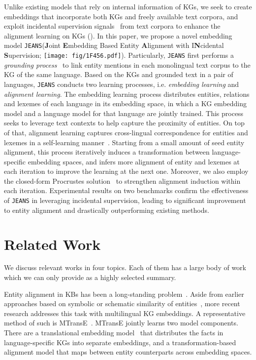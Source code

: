\documentclass[11pt,a4paper]{article}
\newcommand{\stitle}[1]{\vspace{2ex} \noindent{\bf #1}}
\newcommand{\modelname}[0]{\texttt{JEANS}\xspace}
\begin{document}
Unlike existing models that rely on internal information of KGs, we seek to create embeddings that incorporate both KGs and freely available text corpora, and exploit incidental supervision signals~\cite{roth2017incidental} from text corpora to enhance the alignment learning on KGs ().
In this paper, we propose a novel embedding model \modelname (\textbf{J}oint \textbf{E}mbedding Based Entity \textbf{A}lignment with I\textbf{N}cidental \textbf{S}upervision; \texttt{[image: fig/1F456.pdf]}).
Particularly, \modelname first performs a \emph{grounding process}~\cite{gupta2017entity,upadhyay2018joint} to link entity mentions in each monolingual text corpus to the KG of the same language.
Based on the KGs and grounded text in a pair of languages, \modelname conducts two learning processes, i.e. \emph{embedding learning} and \emph{alignment learning}.
The embedding learning process distributes entities, relations and lexemes of each language in its embedding space,
in which a KG embedding model and a language model for that language are jointly trained.
This process seeks to leverage text contexts to help capture the proximity of entities.
On top of that, alignment learning captures cross-lingual correspondence for entities and lexemes in a self-learning manner~\cite{artetxe2018robust}.
Starting from a small amount of seed entity alignment, this process iteratively induces a transformation between language-specific embedding spaces, and infers more alignment of entity and lexemes at each iteration to improve the learning at the next one.
Moreover, we also employ the closed-form Procrustes solution~\cite{conneau2018word} to strengthen alignment induction within each iteration.
Experimental results on two benchmarks confirm the effectiveness of \modelname in leveraging incidental supervision, leading to significant improvement to entity alignment and drastically outperforming existing methods.


%
 \section{Related Work}\label{sec:related}

We discuss relevant works in four topics.
Each of them has a large body of work which we can only provide as a highly selected summary.


\stitle{Entity alignment.}
Entity alignment in KBs has been a long-standing problem~\cite{shvaiko2011ontology}.
Aside from earlier approaches based on symbolic or schematic similarity of entities~\cite{suchanek2011paris,wijaya2013pidgin,jimenez2012large}, more recent research addresses this task with multilingual KG embeddings.
A representative method of such is MTransE~\cite{chen2017multigraph}.
MTransE jointly learns two model components.
There are a translational embedding model~\cite{bordes2013translating} that distributes the facts in language-specific KGs into separate embeddings, and a transformation-based alignment model that maps between entity counterparts across embedding spaces.
\end{document}
